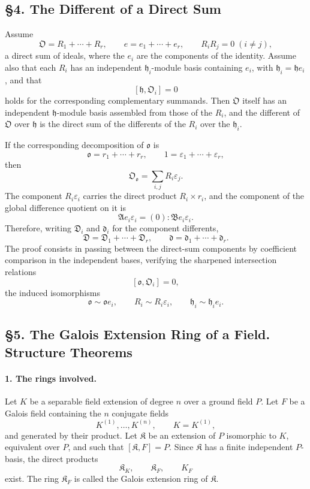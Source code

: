 \documentclass[11pt]{article}
\begin{document}
\subsection*{§4. The Different of a Direct Sum}

Assume
\[
        \mathfrak O=R_1+\cdots+R_r,
        \qquad
        e=e_1+\cdots+e_r,
        \qquad
        R_iR_j=0\;(i\ne j),
\]
a direct sum of ideals, where the $e_i$ are the components of the identity. Assume also that each $R_i$ has an independent $\mathfrak h_i$-module basis containing $e_i$, with $\mathfrak h_i=\mathfrak h e_i$, and that
\[
        [\mathfrak h,\mathfrak O_i]=0
\]
holds for the corresponding complementary summands. Then $\mathfrak O$ itself has an independent $\mathfrak h$-module basis assembled from those of the $R_i$, and the different of $\mathfrak O$ over $\mathfrak h$ is the direct sum of the differents of the $R_i$ over the $\mathfrak h_i$.

If the corresponding decomposition of $\mathfrak o$ is
\[
        \mathfrak o=r_1+
        \cdots+r_r,
        \qquad
        1=\varepsilon_1+
        \cdots+\varepsilon_r,
\]
then
\[
        \mathfrak O_{\mathfrak o}=\sum_{i,j}R_i\varepsilon_j.
\]
The component $R_i\varepsilon_i$ carries the direct product $R_i\times r_i$, and the component of the global difference quotient on it is
\[
        \mathfrak A e_i\varepsilon_i=(0):\mathfrak B e_i\varepsilon_i.
\]
Therefore, writing $\mathfrak D_i$ and $\mathfrak d_i$ for the component differents,
\[
        \mathfrak D=\mathfrak D_1+
        \cdots+\mathfrak D_r,
        \qquad
        \mathfrak d=\mathfrak d_1+
        \cdots+\mathfrak d_r.
\]
The proof consists in passing between the direct-sum components by coefficient comparison in the independent bases, verifying the sharpened intersection relations
\[
        [\mathfrak o,\mathfrak O_i]=0,
\]
the induced isomorphisms
\[
        \mathfrak o\sim\mathfrak o e_i,
        \qquad
        R_i\sim R_i\varepsilon_i,
        \qquad
        \mathfrak h_i\sim \mathfrak h_i e_i.
\]

\subsection*{§5. The Galois Extension Ring of a Field. Structure Theorems}

\paragraph{1. The rings involved.}
Let $K$ be a separable field extension of degree $n$ over a ground field $P$. Let $F$ be a Galois field containing the $n$ conjugate fields
\[
        K^{(1)},\ldots,K^{(n)},
        \qquad K=K^{(1)},
\]
and generated by their product. Let $\mathfrak K$ be an extension of $P$ isomorphic to $K$, equivalent over $P$, and such that $[\mathfrak K,F]=P$. Since $\mathfrak K$ has a finite independent $P$-basis, the direct products
\[
        \mathfrak K_K,
        \qquad \mathfrak K_F,
        \qquad K_F
\]
exist. The ring $\mathfrak K_F$ is called the Galois extension ring of $\mathfrak K$.
\end{document}
